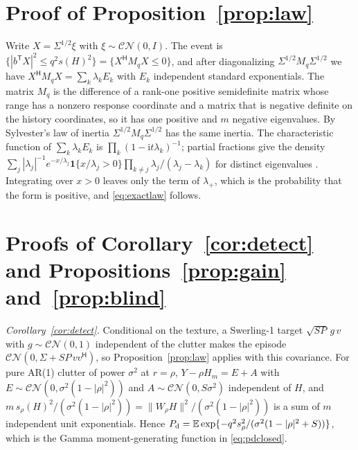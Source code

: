\documentclass[journal]{IEEEtran}
\begin{document}
\appendices
\section{Proof of Proposition~\ref{prop:law}}\label{app:law}
Write $X=\Sigma^{1/2}\xi$ with $\xi\sim\mathcal{CN}(0,I)$. The event is $\{|b^{\mathsf T}X|^2\le q^2s(H)^2\}=\{X^{\mathsf H}M_qX\le0\}$, and after diagonalizing $\Sigma^{1/2}M_q\Sigma^{1/2}$ we have $X^{\mathsf H}M_qX=\sum_k\lambda_kE_k$ with $E_k$ independent standard exponentials. The matrix $M_q$ is the difference of a rank-one positive semidefinite matrix whose range has a nonzero response coordinate and a matrix that is negative definite on the history coordinates, so it has one positive and $m$ negative eigenvalues. By Sylvester's law of inertia $\Sigma^{1/2}M_q\Sigma^{1/2}$ has the same inertia. The characteristic function of $\sum_k\lambda_kE_k$ is $\prod_k(1-\mathrm i t\lambda_k)^{-1}$; partial fractions give the density $\sum_j|\lambda_j|^{-1}e^{-x/\lambda_j}\mathbf 1\{x/\lambda_j>0\}\prod_{k\ne j}\lambda_j/(\lambda_j-\lambda_k)$ for distinct eigenvalues \cite{alnaffouri2016}. Integrating over $x>0$ leaves only the term of $\lambda_+$, which is the probability that the form is positive, and \eqref{eq:exactlaw} follows.

\section{Proofs of Corollary~\ref{cor:detect} and Propositions~\ref{prop:gain} and~\ref{prop:blind}}\label{app:detect}
\emph{Corollary~\ref{cor:detect}.} Conditional on the texture, a Swerling-1 target $\sqrt{SP}\,g\,v$ with $g\sim\mathcal{CN}(0,1)$ independent of the clutter makes the episode $\mathcal{CN}(0,\Sigma+SP\,vv^{\mathsf H})$, so Proposition~\ref{prop:law} applies with this covariance. For pure AR(1) clutter of power $\sigma^2$ at $r=\rho$, $Y-\rho H_m=E+A$ with $E\sim\mathcal{CN}(0,\sigma^2(1-|\rho|^2))$ and $A\sim\mathcal{CN}(0,S\sigma^2)$ independent of $H$, and $m\,s_\rho(H)^2/(\sigma^2(1-|\rho|^2))=\|W_\rho H\|^2/(\sigma^2(1-|\rho|^2))$ is a sum of $m$ independent unit exponentials. Hence $P_{\rm d}=\mathbb E\exp\{-q^2s_\rho^2/(\sigma^2(1-|\rho|^2+S))\}$, which is the Gamma moment-generating function in \eqref{eq:pdclosed}.
\end{document}

